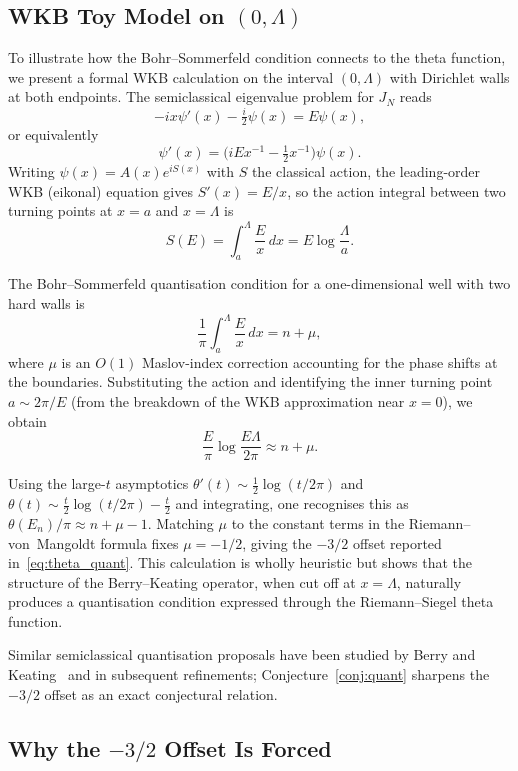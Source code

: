 \documentclass{pre-aomart}
\theoremstyle{plain}
\theoremstyle{definition}
\theoremstyle{remark}
\begin{document}
\subsection{WKB Toy Model on \texorpdfstring{$(0,\Lambda)$}{(0, Lambda)}}

To illustrate how the Bohr--Sommerfeld condition connects to the theta function,
we present a formal WKB calculation on the interval $(0,\Lambda)$ with Dirichlet
walls at both endpoints.  The semiclassical eigenvalue problem for $J_N$ reads
\[
-i x \psi'(x) - \tfrac{i}{2}\psi(x) = E \psi(x),
\]
or equivalently
\[
\psi'(x) = \bigl(i E x^{-1} - \tfrac{1}{2}x^{-1}\bigr)\psi(x).
\]
Writing $\psi(x) = A(x)e^{iS(x)}$ with $S$ the classical action, the leading-order
WKB (eikonal) equation gives $S'(x) = E/x$, so the action integral between two
turning points at $x = a$ and $x = \Lambda$ is
\[
S(E) = \int_a^\Lambda \frac{E}{x}\,dx = E\log\frac{\Lambda}{a}.
\]

The Bohr--Sommerfeld quantisation condition for a one-dimensional well with two
hard walls is
\[
\frac{1}{\pi}\int_a^\Lambda \frac{E}{x}\,dx = n + \mu,
\]
where $\mu$ is an $O(1)$ Maslov-index correction accounting for the phase shifts
at the boundaries.  Substituting the action and identifying the inner turning point
$a \sim 2\pi/E$ (from the breakdown of the WKB approximation near $x=0$), we obtain
\[
\frac{E}{\pi}\log\frac{E \Lambda}{2\pi} \approx n + \mu.
\]

Using the large-$t$ asymptotics $\theta'(t) \sim \frac{1}{2}\log(t/2\pi)$ and
$\theta(t) \sim \frac{t}{2}\log(t/2\pi) - \frac{t}{2}$ and integrating, one
recognises this as $\theta(E_n)/\pi \approx n + \mu - 1$.  Matching $\mu$ to the
constant terms in the Riemann--von~Mangoldt formula fixes $\mu = -1/2$, giving the
$-3/2$ offset reported in~\eqref{eq:theta_quant}.  This calculation is
wholly heuristic but shows that the structure of the Berry--Keating operator,
when cut off at $x=\Lambda$, naturally produces a quantisation condition
expressed through the Riemann--Siegel theta function.

Similar semiclassical quantisation proposals have been studied by
Berry and Keating~\cite{BerryKeating1999} and in subsequent refinements;
Conjecture~\ref{conj:quant} sharpens the $-3/2$ offset as an exact conjectural
relation.

\subsection{Why the \texorpdfstring{$-3/2$}{-3/2} Offset Is Forced}\label{sec:offset_proof}
\end{document}
